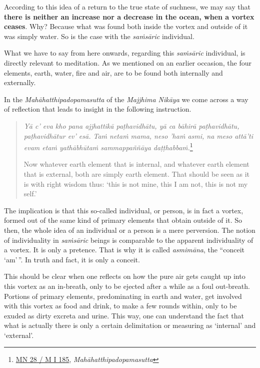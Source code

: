According to this idea of a return to the true state of suchness, we may say that \textbf{there is neither an increase nor a decrease in the ocean, when a vortex ceases}. Why? Because what was found both inside the vortex and outside of it was simply water. So is the case with the \emph{saṁsāric} individual.

What we have to say from here onwards, regarding this \emph{saṁsāric} individual, is directly relevant to meditation. As we mentioned on an earlier occasion, the four elements, earth, water, fire and air, are to be found both internally and externally.

In the \emph{Mahāhatthipadopamasutta} of the \emph{Majjhima Nikāya} we come across a way of reflection that leads to insight in the following instruction.

\begin{quote}
\emph{Yā c' eva kho pana ajjhattikā paṭhavidhātu, yā ca bāhirā paṭhavidhātu, paṭhavidhātur ev' esā. Taṁ netaṁ mama, neso 'haṁ asmi, na meso attā'ti evam etaṁ yathābhūtaṁ sammappaññāya daṭṭhabbaṁ.}\footnote{\href{https://suttacentral.net/mn28/pli/ms}{MN 28 / M I 185}, \emph{Mahāhatthipadopamasutta}}

Now whatever earth element that is internal, and whatever earth element that is external, both are simply earth element. That should be seen as it is with right wisdom thus: `this is not mine, this I am not, this is not my self.'
\end{quote}

The implication is that this so-called individual, or person, is in fact a vortex, formed out of the same kind of primary elements that obtain outside of it. So then, the whole idea of an individual or a person is a mere perversion. The notion of individuality in \emph{saṁsāric} beings is comparable to the apparent individuality of a vortex. It is only a pretence. That is why it is called \emph{asmimāna}, the ``conceit `am'\,''. In truth and fact, it is only a conceit.

This should be clear when one reflects on how the pure air gets caught up into this vortex as an in-breath, only to be ejected after a while as a foul out-breath. Portions of primary elements, predominating in earth and water, get involved with this vortex as food and drink, to make a few rounds within, only to be exuded as dirty excreta and urine. This way, one can understand the fact that what is actually there is only a certain delimitation or measuring as `internal' and `external'.

